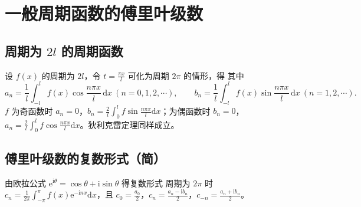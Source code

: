 \section{一般周期函数的傅里叶级数}
\subsection{周期为 $2l$ 的周期函数}

设 $f(x)$ 的周期为 $2l$，令 $t=\frac{\pi x}{l}$ 可化为周期 $2\pi$ 的情形，得
其中
\[
a_n=\frac{1}{l}\int_{-l}^{l}f(x)\cos\frac{n\pi x}{l}\,\mathrm{d}x\ (n=0,1,2,\cdots),\qquad
b_n=\frac{1}{l}\int_{-l}^{l}f(x)\sin\frac{n\pi x}{l}\,\mathrm{d}x\ (n=1,2,\cdots).
\]
$f$ 为奇函数时 $a_n=0$，$b_n=\frac{2}{l}\int_0^{l}f\sin\frac{n\pi x}{l}\mathrm{d}x$；为偶函数时 $b_n=0$，$a_n=\frac{2}{l}\int_0^{l}f\cos\frac{n\pi x}{l}\mathrm{d}x$。狄利克雷定理同样成立。

\subsection{傅里叶级数的复数形式（简）}

由欧拉公式 $\mathrm{e}^{\mathrm{i}\theta}=\cos\theta+\mathrm{i}\sin\theta$ 得复数形式
周期为 $2\pi$ 时 $c_n=\frac{1}{2\pi}\int_{-\pi}^{\pi}f(x)\mathrm{e}^{-\mathrm{i}nx}\mathrm{d}x$，且 $c_0=\frac{a_0}{2}$，$c_n=\frac{a_n-\mathrm{i}b_n}{2}$，$c_{-n}=\frac{a_n+\mathrm{i}b_n}{2}$。

